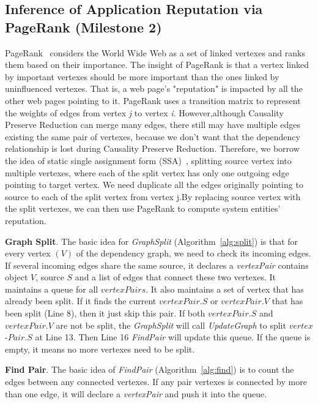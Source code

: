 \subsection{Inference of Application Reputation via\\PageRank (Milestone 2)}

PageRank~\cite{pagerank} considers the World Wide Web as a set of linked vertexes and ranks them based on their importance. The insight of PageRank is that a vertex linked by important vertexes should be more important than the ones linked by uninfluenced vertexes. That is, a web page's "reputation" is impacted by all the other web pages pointing to it. PageRank uses a transition matrix to represent the weights of edges from vertex \textit{j} to vertex \textit{i}. However,although Causality Preserve Reduction can merge many edges, there still may have multiple edges existing the same pair of vertexes, because we don't want that the dependency relationship is lost during Causality Preserve Reduction. Therefore, we borrow the idea of static single assignment form (SSA)~\cite{nielson2004principles}, splitting source vertex  into multiple vertexes, where each of the split vertex has only one outgoing edge pointing to target vertex. We need duplicate all the edges originally pointing to source to each of the split vertex from vertex j.By replacing source vertex with the split vertexes, we can then use PageRank to compute system entities' reputation.

\textbf{Graph Split}.
The basic idea for \emph{GraphSplit} (Algorithm~\ref{alg:split}) is that for every vertex $(V)$ of the dependency graph, we need to check its incoming edges. If several incoming edges share the same source, it declares a \textit{vertexPair} contains object $V$, source $S$ and a list of edges that connect these two vertexes. It maintains a queue for all $vertexPairs$. It also maintains a set of vertex that has already been split. If it finds the current $vertexPair.S$ or $vertexPair.V$ that has been split (Line 8), then it just skip this pair. If both  $vertexPair.S$ and $vertexPair.V$  are not be split, the \emph{GraphSplit} will call \emph{UpdateGraph} to split $vertex$-$Pair.S$ at Line 13. Then Line 16 \emph{FindPair} will update this queue. If the queue is empty, it means no more vertexes need to be split.

\textbf{Find Pair}.
The basic idea of \emph{FindPair} (Algorithm~\ref{alg:find}) is to count the edges between any connected vertexes. If any pair vertexes is connected by more than one edge, it will declare a \textit{vertexPair} and push it into the queue. 

